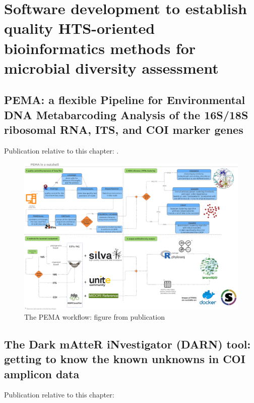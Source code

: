 % 
% 

\chapter{Software development to establish quality HTS-oriented bioinformatics methods for microbial diversity assessment}
\label{cha:2}



\section{PEMA: a flexible Pipeline for Environmental DNA Metabarcoding Analysis of the 16S/18S ribosomal RNA, ITS, and COI marker genes}


Publication relative to this chapter: \cite{zafeiropoulos2020pema}. 


\begin{figure}[!htbp]
   \centering
   \includegraphics[width=0.95\columnwidth]{figures/pema_workflow.jpeg}
   \caption{The PEMA workflow: figure from publication}
\end{figure}



\newpage

\section{The Dark mAtteR iNvestigator (DARN) tool: getting to know the known unknowns in COI amplicon data}

Publication relative to this chapter: \citep{zafeiropoulos2021dark}


